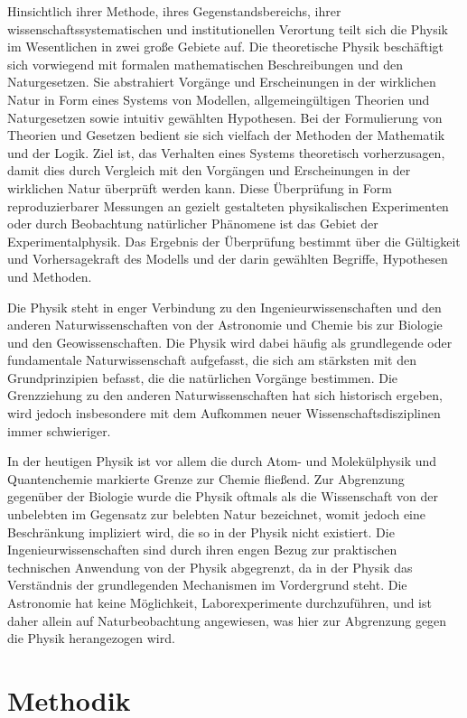 \documentclass[titlepage, parkskip=full, twocolumn, landscape]{scrartcl}
\begin{document}
Hinsichtlich ihrer Methode, ihres Gegenstandsbereichs, ihrer wissenschaftssystematischen und institutionellen Verortung teilt sich die Physik im Wesentlichen in zwei große Gebiete auf. Die theoretische Physik beschäftigt sich vorwiegend mit formalen mathematischen Beschreibungen und den Naturgesetzen. Sie abstrahiert Vorgänge und Erscheinungen in der wirklichen Natur in Form eines Systems von Modellen, allgemeingültigen Theorien und Naturgesetzen sowie intuitiv gewählten Hypothesen. Bei der Formulierung von Theorien und Gesetzen bedient sie sich vielfach der Methoden der Mathematik und der Logik. Ziel ist, das Verhalten eines Systems theoretisch vorherzusagen, damit dies durch Vergleich mit den Vorgängen und Erscheinungen in der wirklichen Natur überprüft werden kann. Diese Überprüfung in Form reproduzierbarer Messungen an gezielt gestalteten physikalischen Experimenten oder durch Beobachtung natürlicher Phänomene ist das Gebiet der Experimentalphysik. Das Ergebnis der Überprüfung bestimmt über die Gültigkeit und Vorhersagekraft des Modells und der darin gewählten Begriffe, Hypothesen und Methoden.

Die Physik steht in enger Verbindung zu den Ingenieurwissenschaften und den anderen Naturwissenschaften von der Astronomie und Chemie bis zur Biologie und den Geowissenschaften. Die Physik wird dabei häufig als grundlegende oder fundamentale Naturwissenschaft aufgefasst, die sich am stärksten mit den Grundprinzipien befasst, die die natürlichen Vorgänge bestimmen. Die Grenzziehung zu den anderen Naturwissenschaften hat sich historisch ergeben, wird jedoch insbesondere mit dem Aufkommen neuer Wissenschaftsdisziplinen immer schwieriger.

In der heutigen Physik ist vor allem die durch Atom- und Molekülphysik und Quantenchemie markierte Grenze zur Chemie fließend. Zur Abgrenzung gegenüber der Biologie wurde die Physik oftmals als die Wissenschaft von der unbelebten im Gegensatz zur belebten Natur bezeichnet, womit jedoch eine Beschränkung impliziert wird, die so in der Physik nicht existiert. Die Ingenieurwissenschaften sind durch ihren engen Bezug zur praktischen technischen Anwendung von der Physik abgegrenzt, da in der Physik das Verständnis der grundlegenden Mechanismen im Vordergrund steht. Die Astronomie hat keine Möglichkeit, Laborexperimente durchzuführen, und ist daher allein auf Naturbeobachtung angewiesen, was hier zur Abgrenzung gegen die Physik herangezogen wird.

\section{Methodik}
\end{document}
